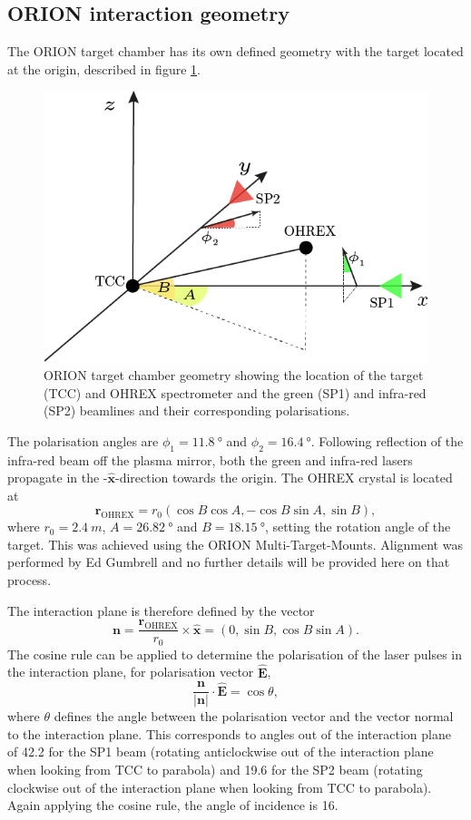 \subsection{ORION interaction geometry}
The ORION target chamber has its own defined geometry with the target located at the origin, described in figure \ref{fig:miscoriontargetchambergeometry}.
\begin{figure}
	\centering
	\includegraphics[width=0.5\linewidth]{figures/misc/misc_ORION_target_chamber_geometry}
	\caption{ORION target chamber geometry showing the location of the target (TCC) and OHREX spectrometer and the green (SP1) and infra-red (SP2) beamlines and their corresponding polarisations.}
	\label{fig:miscoriontargetchambergeometry}
\end{figure}
The polarisation angles are $\phi_1 = \qty{11.8}{\degree}$ and $\phi_2 = \qty{16.4}{\degree}$. Following reflection of the infra-red beam off the plasma mirror, both the green and infra-red lasers propagate in the -$\hat{\mathbf{x}}$-direction  towards the origin. The OHREX crystal is located at 
\begin{equation}
	\mathbf{r}_\mathrm{OHREX} = r_0(\cos B\cos A,-\cos B\sin A, \sin B),
\end{equation}
where $r_0 = \qty{2.4}{m}$, $A = \qty{26.82} {\degree} $ and $B = \qty{18.15}{\degree}$, setting the rotation angle of the target. This was achieved using the ORION Multi-Target-Mounts. Alignment was performed by Ed Gumbrell and no further details will be provided here on that process. 

The interaction plane is therefore defined by the vector
\begin{equation}
	\mathbf{n} = \frac{\mathbf{r}_\mathrm{OHREX}}{r_0} \times  \hat{\mathbf{x}} = (0,\sin B, \cos B\sin A).
\end{equation}
The cosine rule can be applied to determine the polarisation of the laser pulses in the interaction plane, for polarisation vector $\hat{\mathbf{E}}$,
\begin{equation}
	\frac{\mathbf{n}}{|\mathbf{n}|}\cdot\hat{\mathbf{E}} = \cos\theta,
\end{equation}
where $\theta$ defines the angle between the polarisation vector and the vector normal to the interaction plane. This corresponds to angles out of the interaction plane of 42.2 \degree for the SP1 beam (rotating anticlockwise out of the interaction plane when looking from TCC to parabola) and 19.6 \degree for the SP2 beam (rotating clockwise out of the interaction plane when looking from TCC to parabola). Again applying the cosine rule, the angle of incidence is 16\degree .


